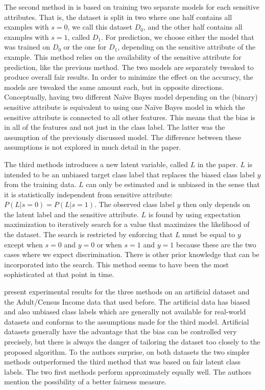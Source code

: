 The second method in \citet{calders2010three}
is based on training two separate models for each sensitive attributes.
That is, the dataset is split in two
where one half contains all examples with \(s=0\), we call this dataset \(D_0\),
and the other half contains all examples with \(s=1\), called \(D_1\).
For prediction, we choose either the model that was trained on \(D_0\) or the one for \(D_1\),
depending on the sensitive attribute of the example.
This method relies on the availability of the sensitive attribute for prediction,
like the previous method.
The two models are separately tweaked to produce overall fair results.
In order to minimize the effect on the accuracy, the models are tweaked the same amount each,
but in opposite directions.
Conceptually, having two different Na\"ive Bayes model depending on the (binary) sensitive attribute
is equivalent to using one Na\"ive Bayes model
in which the sensitive attribute is connected to all other features.
This means that the bias is in all of the features and not just in the class label.
The latter was the assumption of the previously discussed model.
The difference between these assumptions is not explored in much detail in the paper.

The third methods introduces a new latent variable, called \(L\) in the paper.
\(L\) is intended to be an unbiased target class label
that replaces the biased class label \(y\) from the training data.
\(L\) can only be estimated and is unbiased
in the sense that it is statistically independent from sensitive attribute: \(P(L|s=0) = P(L|s=1)\).
The observed class label \(y\) then only depends on the latent label and the sensitive attribute.
\(L\) is found by using expectation maximization
to iteratively search for a value that maximizes the likelihood of the dataset.
The search is restricted by enforcing that \(L\) must be equal to \(y\) except
when \(s=0\) and \(y=0\) or when \(s=1\) and \(y=1\)
because these are the two cases where we expect discrimination.
There is other prior knowledge that can be incorporated into the search.
This method seems to have been the most sophisticated at that point in time.

\citet{calders2010three} present experimental results for the three methods on an artificial dataset
and the Adult/Census Income data that \citet{calders2009building} used before.
The artificial data has biased and also unbiased class labels
which are generally not available for real-world datasets
and conforms to the assumptions made for the third model.
Artificial datasets generally have the advantage that the bias can be controlled very precisely,
but there is always the danger of tailoring the dataset too closely to the proposed algorithm.
To the authors surprise, on both datasets the two simpler methods outperformed the third method
that was based on fair latent class labels.
The two first methods perform approximately equally well.
The authors mention the possibility of a better fairness measure.

